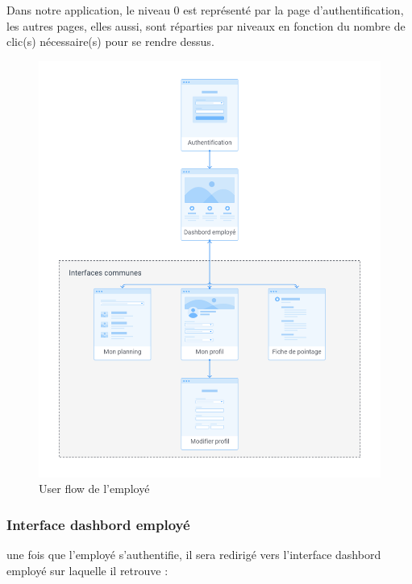 Dans notre application, le niveau 0 est représenté par la page d’authentification, les autres pages, elles aussi, sont réparties par niveaux en fonction du nombre de clic(s) nécessaire(s) pour se rendre dessus.
            \begin{figure}[h!]
                        \vspace{-30pt}
                        \centering
                        \includegraphics[scale=0.38 ]{images/interface/Espace employe.png}
                        \vspace{-20pt}
                        \caption{User flow de l'employé}
                        \label{fig91}
            \end{figure} 
            \clearpage
            
            \subsubsection*{Interface dashbord employé}
             une fois que l’employé s'authentifie, il sera redirigé vers l’interface dashbord employé sur laquelle il retrouve :

